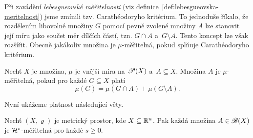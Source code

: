Při zavádění \emph{lebesgueovské měřitelnosti} (viz definice~\ref{def:lebesgueovska-meritelnost}) jsme zmínili tzv. Carathéodoryho kritérium. To jednoduše říkalo, že rozdělením libovolné množiny $G$ pomocí pevně zvolené množiny $A$ lze stanovit její míru jako součet měr dílčích částí, tzn. $G\cap A$ a~$G\setminus A$. Tento koncept lze však rozšířit. Obecně jakákoliv množina je $\mu$-měřitelná, pokud splňuje Carathéodoryho kritérium.
\begin{definition}\label{def:meritelnost}
    Nechť $X$ je množina, $\mu$ je vnější míra na $\mathscr{P}(X)$ a~$A\subseteq X$. Množina $A$ je $\mu$-měřitelná, pokud pro každé $G\subseteq X$ platí
    \[\mu(G)=\mu(G\cap A)+\mu(G\setminus A).\]
\end{definition}
Nyní ukážeme platnost následující věty.
\begin{theorem}\label{thm:hs-meritelnost-borel-mnozin}
    Nechť $(X,\varrho)$ je metrický prostor, kde $X\subseteq\mathbb{R}^n$. Pak každá množina $A\in\mathscr{B}(X)$ je $\mathcal{H}^{s}$-měřitelná pro každé $s\geqslant 0$.
\end{theorem}
